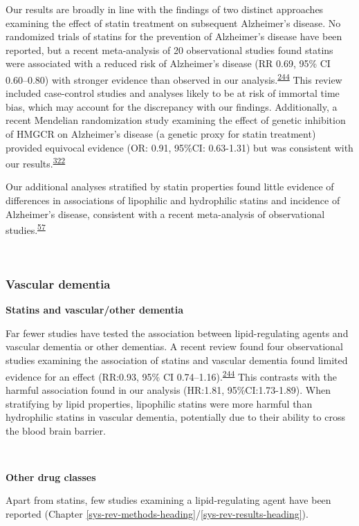 \documentclass[a4paper, twoside]{templates/ociamthesis}
\begin{document}
Our results are broadly in line with the findings of two distinct approaches examining the effect of statin treatment on subsequent Alzheimer's disease. No randomized trials of statins for the prevention of Alzheimer's disease have been reported, but a recent meta-analysis of 20 observational studies found statins were associated with a reduced risk of Alzheimer's disease (RR 0.69, 95\% CI 0.60--0.80) with stronger evidence than observed in our analysis.\textsuperscript{\protect\hyperlink{ref-poly2020}{244}} This review included case-control studies and analyses likely to be at risk of immortal time bias, which may account for the discrepancy with our findings. Additionally, a recent Mendelian randomization study examining the effect of genetic inhibition of HMGCR on Alzheimer's disease (a genetic proxy for statin treatment) provided equivocal evidence (OR: 0.91, 95\%CI: 0.63-1.31) but was consistent with our results.\textsuperscript{\protect\hyperlink{ref-williams2020}{322}}

Our additional analyses stratified by statin properties found little evidence of differences in associations of lipophilic and hydrophilic statins and incidence of Alzheimer's disease, consistent with a recent meta-analysis of observational studies.\textsuperscript{\protect\hyperlink{ref-chu2018}{57}}

~

\hypertarget{vascular-dementia}{%
\subsubsection{Vascular dementia}\label{vascular-dementia}}

\textbf{Statins and vascular/other dementia}

Far fewer studies have tested the association between lipid-regulating agents and vascular dementia or other dementias. A recent review found four observational studies examining the association of statins and vascular dementia found limited evidence for an effect (RR:0.93, 95\% CI 0.74--1.16).\textsuperscript{\protect\hyperlink{ref-poly2020}{244}} This contrasts with the harmful association found in our analysis (HR:1.81, 95\%CI:1.73-1.89). When stratifying by lipid properties, lipophilic statins were more harmful than hydrophilic statins in vascular dementia, potentially due to their ability to cross the blood brain barrier.

~

\textbf{Other drug classes}

Apart from statins, few studies examining a lipid-regulating agent have been reported (Chapter \ref{sys-rev-methods-heading}/\ref{sys-rev-results-heading}).
\end{document}
